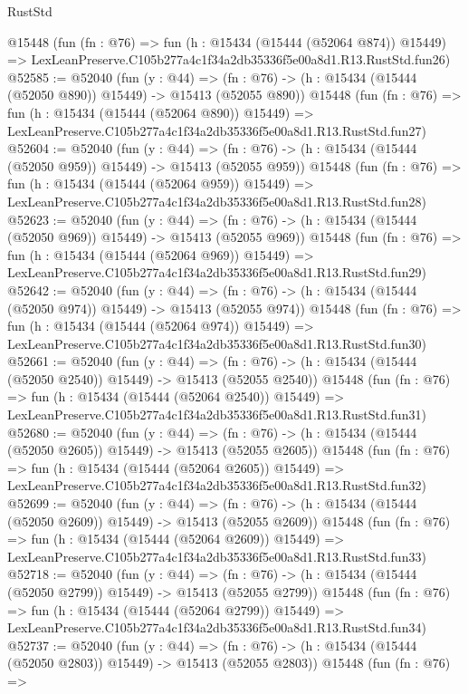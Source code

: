 \begin{lexlean}{RustStd}
\begin{coremodule}
    @15448
    (fun (fn : @76) =>
    fun (h : @15434 (@15444 (@52064 @874)) @15449) =>
    LexLeanPreserve.C105b277a4c1f34a2db35336f5e00a8d1.R13.RustStd.fun26)
@52585 := @52040
    (fun (y : @44) =>
    (fn : @76) -> (h : @15434 (@15444 (@52050 @890)) @15449) -> @15413 (@52055 @890))
    @15448
    (fun (fn : @76) =>
    fun (h : @15434 (@15444 (@52064 @890)) @15449) =>
    LexLeanPreserve.C105b277a4c1f34a2db35336f5e00a8d1.R13.RustStd.fun27)
@52604 := @52040
    (fun (y : @44) =>
    (fn : @76) -> (h : @15434 (@15444 (@52050 @959)) @15449) -> @15413 (@52055 @959))
    @15448
    (fun (fn : @76) =>
    fun (h : @15434 (@15444 (@52064 @959)) @15449) =>
    LexLeanPreserve.C105b277a4c1f34a2db35336f5e00a8d1.R13.RustStd.fun28)
@52623 := @52040
    (fun (y : @44) =>
    (fn : @76) -> (h : @15434 (@15444 (@52050 @969)) @15449) -> @15413 (@52055 @969))
    @15448
    (fun (fn : @76) =>
    fun (h : @15434 (@15444 (@52064 @969)) @15449) =>
    LexLeanPreserve.C105b277a4c1f34a2db35336f5e00a8d1.R13.RustStd.fun29)
@52642 := @52040
    (fun (y : @44) =>
    (fn : @76) -> (h : @15434 (@15444 (@52050 @974)) @15449) -> @15413 (@52055 @974))
    @15448
    (fun (fn : @76) =>
    fun (h : @15434 (@15444 (@52064 @974)) @15449) =>
    LexLeanPreserve.C105b277a4c1f34a2db35336f5e00a8d1.R13.RustStd.fun30)
@52661 := @52040
    (fun (y : @44) =>
    (fn : @76) -> (h : @15434 (@15444 (@52050 @2540)) @15449) -> @15413 (@52055 @2540))
    @15448
    (fun (fn : @76) =>
    fun (h : @15434 (@15444 (@52064 @2540)) @15449) =>
    LexLeanPreserve.C105b277a4c1f34a2db35336f5e00a8d1.R13.RustStd.fun31)
@52680 := @52040
    (fun (y : @44) =>
    (fn : @76) -> (h : @15434 (@15444 (@52050 @2605)) @15449) -> @15413 (@52055 @2605))
    @15448
    (fun (fn : @76) =>
    fun (h : @15434 (@15444 (@52064 @2605)) @15449) =>
    LexLeanPreserve.C105b277a4c1f34a2db35336f5e00a8d1.R13.RustStd.fun32)
@52699 := @52040
    (fun (y : @44) =>
    (fn : @76) -> (h : @15434 (@15444 (@52050 @2609)) @15449) -> @15413 (@52055 @2609))
    @15448
    (fun (fn : @76) =>
    fun (h : @15434 (@15444 (@52064 @2609)) @15449) =>
    LexLeanPreserve.C105b277a4c1f34a2db35336f5e00a8d1.R13.RustStd.fun33)
@52718 := @52040
    (fun (y : @44) =>
    (fn : @76) -> (h : @15434 (@15444 (@52050 @2799)) @15449) -> @15413 (@52055 @2799))
    @15448
    (fun (fn : @76) =>
    fun (h : @15434 (@15444 (@52064 @2799)) @15449) =>
    LexLeanPreserve.C105b277a4c1f34a2db35336f5e00a8d1.R13.RustStd.fun34)
@52737 := @52040
    (fun (y : @44) =>
    (fn : @76) -> (h : @15434 (@15444 (@52050 @2803)) @15449) -> @15413 (@52055 @2803))
    @15448
    (fun (fn : @76) =>

\end{coremodule}
\end{lexlean}
